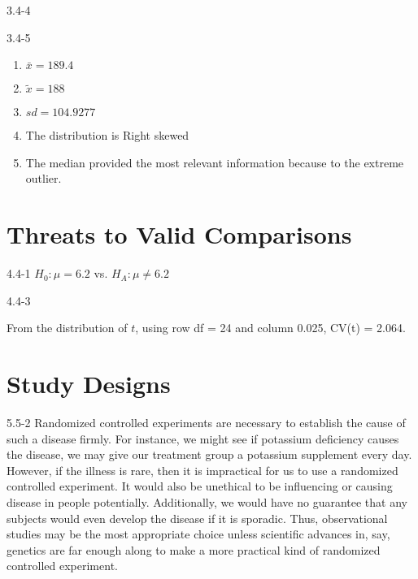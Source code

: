 \begin{exsol@solution}{3.4-4}


\end{exsol@solution}
\begin{exsol@solution}{3.4-5}

\begin{enumerate}
\item $\bar{x} = 189.4$
\item $\tilde{x} = 188$
\item $sd = 104.9277 $
\item The distribution is Right skewed
\item The median provided the most relevant information because to the extreme outlier.
\end{enumerate}

\end{exsol@solution}
\setcounter{chapter}{4}\chapter{Threats to Valid Comparisons}
\begin{exsol@solution}{4.4-1}
	  $H_0: \mu = 6.2$ vs. $H_A: \mu \neq 6.2$
\end{exsol@solution}
\begin{exsol@solution}{4.4-3}

    From the distribution of $t$, using row df = 24 and column 0.025, CV(t) = 2.064.
\end{exsol@solution}
\setcounter{chapter}{5}\chapter{Study Designs}
\begin{exsol@solution}{5.5-2}
Randomized controlled experiments are necessary to establish the cause of such a disease firmly. For instance, we might see if potassium deficiency causes the disease, we may give our treatment group a potassium supplement every day. However, if the illness is rare, then it is impractical for us to use a randomized controlled experiment.  It would also be unethical to be influencing or causing disease in people potentially.  Additionally, we would have no guarantee that any subjects would even develop the disease if it is sporadic. Thus, observational studies may be the most appropriate choice unless scientific advances in, say, genetics are far enough along to make a more practical kind of randomized controlled experiment.
	
\end{exsol@solution}
